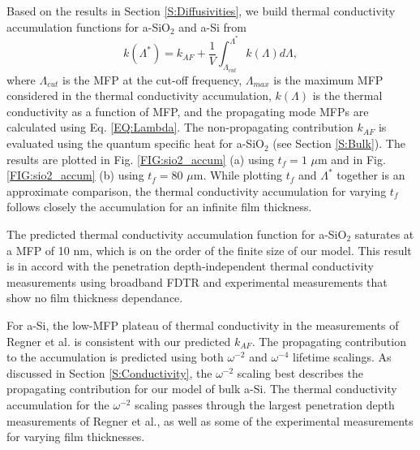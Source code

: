 \documentclass[aps,prb,onecolumn,preprint,superscriptaddress,footinbib,amsmath,amssymb,floatfix]{revtex4}
\begin{document}
Based on the results in Section \ref{S:Diffusivities}, we build 
thermal conductivity accumulation functions for a-SiO$_2$ and a-Si from
\begin{equation}\label{EQ:kLambda}
k(\Lambda^{*}) = k_{AF} + 
\frac{1}{V}\int^{\Lambda^{*}}_{\Lambda_{cut}} 
k(\Lambda)d\Lambda,
\end{equation}
where $\Lambda_{cut}$ is the MFP at the cut-off frequency, 
$\Lambda_{max}$ is the maximum MFP considered in the thermal 
conductivity accumulation, $k(\Lambda)$ is the thermal conductivity 
as a function of MFP, and the propagating mode MFPs are 
calculated using Eq. \eqref{EQ:Lambda}. The 
non-propagating contribution $k_{AF}$ is evaluated using the quantum 
specific heat for a-SiO$_2$ (see Section \ref{S:Bulk}). 
The results are plotted 
in Fig. \ref{FIG:sio2_accum} (a) using $t_f=1$ $\mu$m 
and in Fig. \ref{FIG:sio2_accum} (b) using $t_f=80$ $\mu$m. While 
plotting $t_f$ and $\Lambda^{*}$ together is an approximate comparison, 
the thermal conductivity accumulation for varying $t_f$ follows closely 
the accumulation for an infinite film thickness. 

The predicted thermal conductivity accumulation function for a-SiO$_2$ 
saturates 
at a MFP of 10 nm, which is on the order of the finite size 
of our model.  
This result is in accord 
with the penetration depth-independent thermal 
conductivity measurements using broadband FDTR
\cite{regner_broadband_2013} and experimental measurements 
that show no film thickness dependance.
\cite{lee_heat_1997,yamane_measurement_2002} 

For a-Si, the low-MFP plateau of thermal conductivity in the   
measurements of Regner et al. is consistent with our 
predicted $k_{AF}$. 
The propagating contribution to the accumulation is predicted 
using both $\omega^{-2}$ and $\omega^{-4}$ lifetime scalings.  
As discussed in Section \ref{S:Conductivity}, 
the $\omega^{-2}$ scaling best describes the propagating 
contribution for our model of bulk a-Si. 
The thermal conductivity accumulation for the $\omega^{-2}$ 
scaling 
passes through the largest penetration 
depth measurements of Regner et al., as well as some of the  
experimental measurements for varying film thicknesses. 
\end{document}
